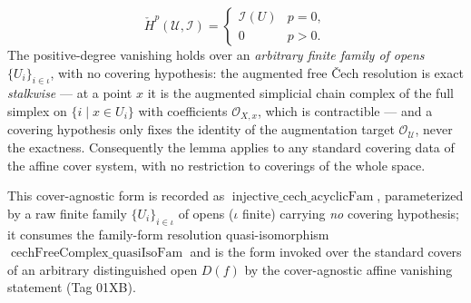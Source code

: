 \begin{lemma}
  \[
    \check{H}^p(\mathcal{U}, \mathcal{I}) =
    \begin{cases}
      \mathcal{I}(U) & p = 0, \\
      0 & p > 0.
    \end{cases}
  \]
  The positive-degree vanishing holds over an \emph{arbitrary finite family of opens}
  \(\{U_i\}_{i \in \iota}\), with no covering hypothesis: the augmented free {\v C}ech
  resolution is exact \emph{stalkwise} — at a point \(x\) it is the augmented simplicial
  chain complex of the full simplex on \(\{i \mid x \in U_i\}\) with coefficients
  \(\mathcal{O}_{X,x}\), which is contractible — and a covering hypothesis only fixes the
  identity of the augmentation target \(\mathcal{O}_\mathcal{U}\), never the exactness.
  Consequently the lemma applies to any standard covering data of the affine cover system,
  with no restriction to coverings of the whole space.

  This cover-agnostic form is recorded as \(\operatorname{injective\_cech\_acyclicFam}\),
  parameterized by a raw finite family \(\{U_i\}_{i \in \iota}\) of opens
  (\(\iota\) finite) carrying \emph{no} covering hypothesis; it consumes the family-form
  resolution quasi-isomorphism \(\operatorname{cechFreeComplex\_quasiIsoFam}\) and is the
  form invoked over the standard covers of an arbitrary distinguished open \(D(f)\) by the
  cover-agnostic affine vanishing statement (Tag 01XB).
\end{lemma}

